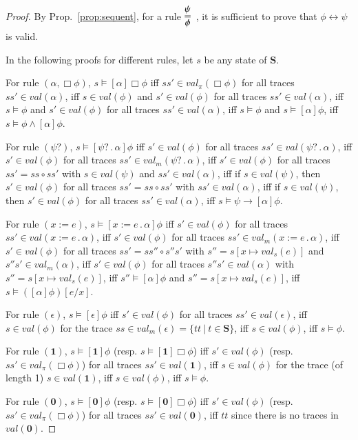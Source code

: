 \documentclass{fcs}
\newcommand{\bff}[1]{\mathbf{#1}}
\newcommand{\noth}[0]{\mathbf{1}}
\newcommand{\halt}[0]{\mathbf{0}}
\newcommand{\true}[0]{\mathit{tt}}
\newcommand{\val}[0]{\mathit{val}}
\DeclareMathOperator{\nex}{.}
\newcommand{\mval}[0]{\mathit{val}_m}
\begin{document}
\begin{proof}
By Prop.~\ref{prop:sequent}, for a rule $\begin{aligned}\infer=[]{\phi}{\psi}\end{aligned}$, it is sufficient to prove that $\phi\leftrightarrow \psi$ is valid.

In the following proofs for different rules, let $s$ be any state of $\bff{S}$.

For rule $(\alpha, \Box\phi)$, $s\models [\alpha]\Box\phi$ iff $ss'\in \val_\pi(\Box\phi)$ for all traces $ss'\in \val(\alpha)$, iff $s\in \val(\phi)$ and $s'\in \val(\phi)$ for all traces $ss'\in \val(\alpha)$,
iff $s\models \phi$ and $s'\in \val(\phi)$ for all traces $ss'\in \val(\alpha)$, iff $s\models \phi$ and $s\models [\alpha]\phi$, iff $s\models \phi\wedge [\alpha]\phi$.

For rule $(\psi?)$, $s\models [\psi?\nex \alpha]\phi$ iff $s'\in \val(\phi)$ for all traces $ss'\in \val(\psi?\nex \alpha)$,
iff $s'\in \val(\phi)$ for all traces $ss'\in \mval(\psi?\nex \alpha)$,
iff $s'\in \val(\phi)$ for all traces $ss'=ss\circ ss'$ with $s\in \val(\psi)$ and $ss'\in \val(\alpha)$,
iff if $s\in \val(\psi)$, then $s'\in \val(\phi)$ for all traces $ss'=ss\circ ss'$ with $ss'\in \val(\alpha)$,
iff if $s\in \val(\psi)$, then $s'\in \val(\phi)$ for all traces $ss'\in \val(\alpha)$,
iff $s\models \psi \to [\alpha]\phi$.

For rule $(x:=e)$, $s\models [x:=e\nex \alpha]\phi$ iff $s'\in \val(\phi)$ for all traces $ss'\in \val(x:=e\nex \alpha)$,
iff $s'\in \val(\phi)$ for all traces $ss'\in \mval(x:=e\nex \alpha)$,
iff $s'\in \val(\phi)$ for all traces $ss' = ss''\circ s''s'$ with $s''=s[x\mapsto \val_s(e)]$ and $s''s'\in \mval(\alpha)$,
iff $s'\in \val(\phi)$ for all traces $s''s'\in \val(\alpha)$ with $s''=s[x\mapsto \val_s(e)]$,
iff $s''\models [\alpha]\phi$ and $s''=s[x\mapsto \val_s(e)]$,
iff $s\models ([\alpha]\phi)[e/x]$.

For rule $(\epsilon)$, $s\models [\epsilon]\phi$ iff $s'\in \val(\phi)$ for all traces $ss'\in \val(\epsilon)$,
iff $s\in \val(\phi)$ for the trace $ss\in \mval(\epsilon) = \{tt\ |\ t\in \bff{S}\}$,
iff $s\in \val(\phi)$, iff $s\models \phi$.

For rule $(\noth)$, $s\models [\noth]\phi$ (resp. $s\models [\noth]\Box\phi$) iff $s'\in \val(\phi)$ (resp. $ss'\in \val_\pi(\Box\phi)$) for all traces $ss'\in \val(\noth)$,
iff $s\in \val(\phi)$ for the trace (of length 1) $s\in \val(\noth)$,
iff $s\in \val(\phi)$, iff $s\models \phi$.

For rule $(\halt)$, $s\models [\halt]\phi$ (resp. $s\models [\halt]\Box\phi$) iff $s'\in \val(\phi)$ (resp. $ss'\in \val_\pi(\Box\phi)$) for all traces $ss'\in \val(\halt)$,
iff $\true$ since there is no traces in $\val(\halt)$.

\end{proof}
\end{document}
